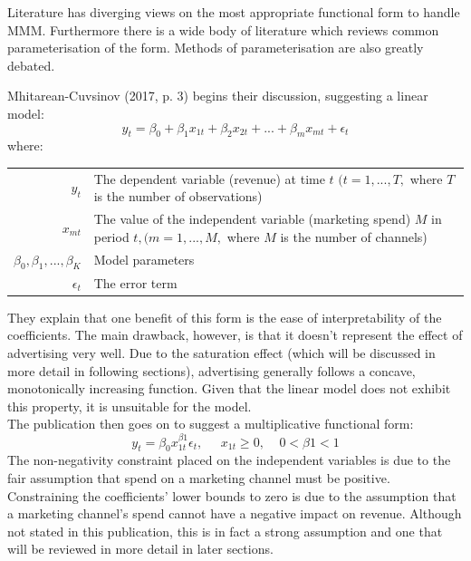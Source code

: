 \documentclass[11pt, a4paper]{article}
\begin{document}
Literature has diverging views on the most appropriate functional form to handle MMM. Furthermore there is a wide body of literature which reviews common parameterisation of the form. Methods of parameterisation are also greatly debated. 
\newpage

Mhitarean-Cuvsinov (2017, p. 3) begins their discussion, suggesting a linear model: 
\begin{equation}
    y_{t}=\beta_{0} + \beta_{1}x_{1t} + \beta_{2}x_{2t} + ... + \beta_{m}x_{mt} + \epsilon_{t}
\end{equation}
where:\\
\hspace{1cm}
\begin{tabular}{r@{ : }p{10cm}}
$y_{t}$ & The dependent variable (revenue) at time $t$ $(t=1,...,T,$ where $T$ is the number of observations)\\ 
$x_{mt}$ & The value of the independent variable (marketing spend) $M$ in period $t, (m=1,...,M,$ where $M$ is the number of channels)\\
$\beta_{0},\beta_{1},...,\beta_{K}$ & Model parameters\\
$\epsilon_{t}$ & The error term\\
\end{tabular}

They explain that one benefit of this form is the ease of interpretability of the coefficients. The main drawback, however, is that it doesn’t represent the effect of advertising very well. Due to the saturation effect (which will be discussed in more detail in following sections), advertising generally follows a concave, monotonically increasing function. Given that the linear model does not exhibit this property, it is unsuitable for the model. \\

The publication then goes on to suggest a multiplicative functional form:
\begin{equation}
y_{t}=\beta_{0}x^{\beta1}_{1t}\epsilon_{t},\;\;\;\;\;x_{1t}\geq0, \;\;\;\;0<\beta1<1
\end{equation}
The non-negativity constraint placed on the independent variables is due to the fair assumption that spend on a marketing channel must be positive. Constraining the coefficients’ lower bounds to zero is due to the assumption that a marketing channel’s spend cannot have a negative impact on revenue. Although not stated in this publication, this is in fact a strong assumption and one that will be reviewed in more detail in later sections.
\end{document}
